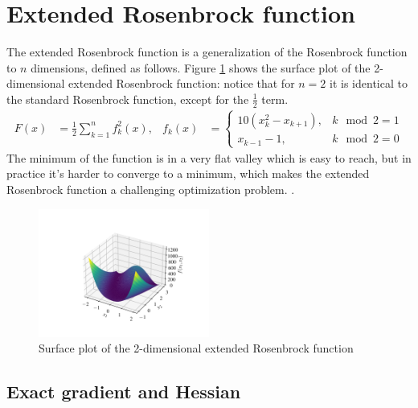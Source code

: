 \section{Extended Rosenbrock function}
\label{sec:extended_rosenbrock_results}

The extended Rosenbrock function is a generalization of the Rosenbrock function to $n$ dimensions, defined as follows.
Figure \ref{fig:extended_rosenbrock_surf} shows the surface plot of the 2-dimensional extended Rosenbrock function: notice that for $n=2$ it is identical to the standard Rosenbrock function, except for the $\frac12$ term.
\begin{align}
\label{eq:extended_rosenbrock}
F(x) &= \frac12 \sum_{k=1}^n f_k^2(x), &
f_k(x) &= \left \{ \begin{array}{ll}
10(x_k^2 - x_{k+1}), & k\mod 2 = 1\\
x_{k-1} -1, & k\mod 2 = 0
\end{array} \right .
\end{align}
The minimum of the function is in a very flat valley which is easy to reach, but in practice it's harder to converge to a minimum, which makes the extended Rosenbrock function a challenging optimization problem.
.

\begin{figure}
    \centering
    \includegraphics[width=0.5\textwidth]{figures/extended_rosenbrock_surf.pdf}
    \caption{Surface plot of the 2-dimensional extended Rosenbrock function}
    \label{fig:extended_rosenbrock_surf}
\end{figure}

\subsection{Exact gradient and Hessian}


